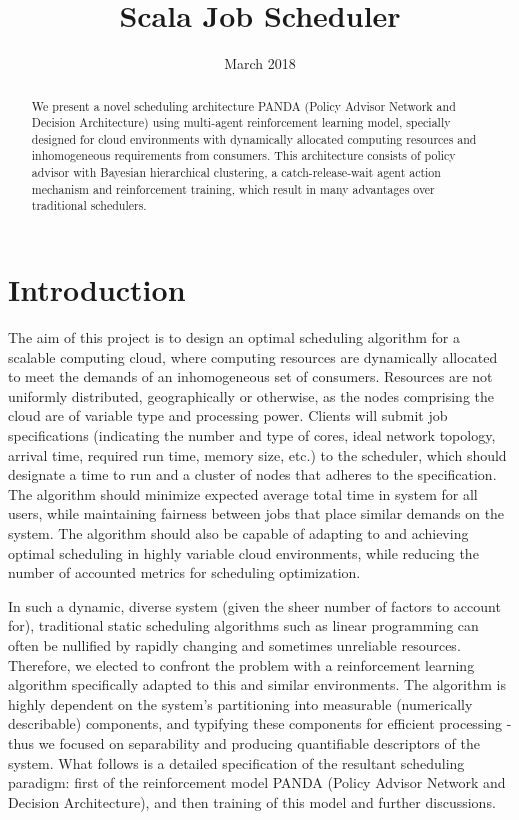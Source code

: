 \documentclass{article}
\title{Scala Job Scheduler}
\date{March 2018}
\theoremstyle{definition}
\theoremstyle{remark}
\begin{document}
	\maketitle

	\begin{abstract}
		We present a novel scheduling architecture PANDA (Policy Advisor Network and Decision Architecture) using
		multi-agent reinforcement learning model, specially designed for cloud environments with dynamically allocated computing
		resources and inhomogeneous requirements from consumers. This architecture consists of policy advisor with
		Bayesian hierarchical clustering, a catch-release-wait agent action mechanism and reinforcement training,
		which result in many advantages over traditional schedulers.
	\end{abstract}

	\newpage


	\section*{Introduction}

	The aim of this project is to design an optimal scheduling algorithm for a scalable computing cloud, where computing resources are dynamically allocated to meet the demands of an inhomogeneous set of consumers. Resources are not uniformly distributed, geographically or otherwise, as the nodes comprising the cloud are of variable type and processing power. Clients will submit job specifications (indicating the number and type of cores, ideal network topology, arrival time, required run time, memory size, etc.) to the scheduler, which should designate a time to run and a cluster of nodes that adheres to the specification. The algorithm should minimize expected average total time in system for all users, while maintaining fairness between jobs that place similar demands on the system. The algorithm should also be capable of adapting to and achieving optimal scheduling in highly variable cloud environments, while reducing the number of accounted metrics for scheduling optimization.

	In such a dynamic, diverse system (given the sheer number of factors to account	for), traditional static scheduling algorithms such as linear programming can often be nullified by rapidly changing and sometimes unreliable resources. Therefore, we elected to confront the problem with a reinforcement learning algorithm specifically adapted to this and similar environments. The algorithm is highly dependent on the system's partitioning into measurable (numerically describable) components, and typifying these components for efficient processing - thus we focused on separability and producing quantifiable descriptors of the system. What follows is a detailed specification of the resultant scheduling paradigm: first of the reinforcement model PANDA (Policy Advisor Network and Decision Architecture), and then training of this model and further discussions.
\end{document}
